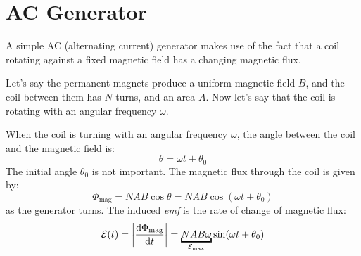 \section{AC Generator}

A simple AC (alternating current) generator makes use of the fact that a 
coil rotating against a fixed magnetic field has a changing magnetic flux.
\begin{center}
\end{center}
Let's say the permanent magnets produce a uniform magnetic field $B$, and the
coil between them has $N$ turns, and an area $A$. Now let's say that the coil
is rotating with an angular frequency $\omega$.

%
%
%
%  

When the coil is turning with an angular frequency $\omega$, the angle
between the coil and the magnetic field is:
\begin{equation*}
  \theta=\omega t+\theta_0
\end{equation*}
The initial angle $\theta_0$ is not important. The magnetic
flux through the coil is given by:
\begin{equation}
  \Phi_\text{mag} = NAB\cos\theta = NAB\cos(\omega t+\theta_0)
\end{equation}
as the generator turns. The induced \emph{emf} is the rate
of change of magnetic flux:
\begin{equation}
  \mathcal E(t) =\left|\diff{\Phi_\text{mag}}t\right| =
  \underbracket{NAB\omega}_{\mathcal E_\text{max}}\sin(\omega t+\theta_0)
\end{equation}


%
%
%
